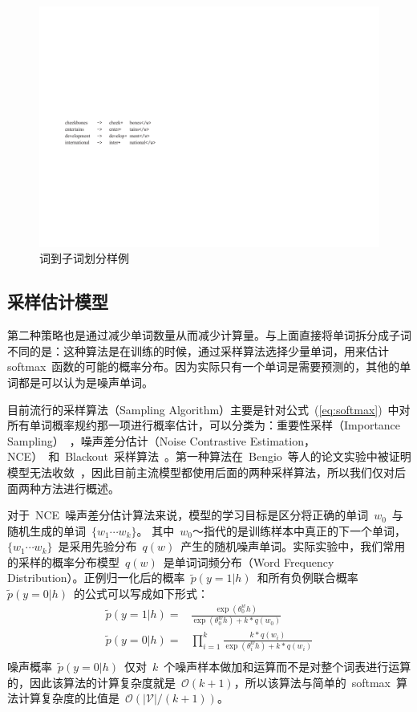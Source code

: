 \begin{figure}[!h]
  \centering
\includegraphics[width=0.56\linewidth]{./figures/subword.pdf}
\caption{词到子词划分样例}\label{fig:subword}
\end{figure}

\subsection{采样估计模型}
第二种策略也是通过减少单词数量从而减少计算量。与上面直接将单词拆分成子词不同的是：这种算法是在训练的时候，通过采样算法选择少量单词，用来估计softmax~函数的可能的概率分布。因为实际只有一个单词是需要预测的，其他的单词都是可以认为是噪声单词。

目前流行的采样算法（Sampling Algorithm）主要是针对公式~(\ref{eq:softmax})~中对所有单词概率规约那一项进行概率估计，可以分类为：重要性采样（Importance Sampling）~，噪声差分估计（Noise Contrastive Estimation，NCE）~和~Blackout~采样算法~。第一种算法在~Bengio~等人的论文实验中被证明模型无法收敛~，因此目前主流模型都使用后面的两种采样算法，所以我们仅对后面两种方法进行概述。

对于~NCE~噪声差分估计算法来说，模型的学习目标是区分将正确的单词~$w_0$~与随机生成的单词~$\{w_1\cdots w_k\}$。
其中~$w_0$～指代的是训练样本中真正的下一个单词，$\{w_1\cdots w_k\}$~是采用先验分布~$q(w)$~产生的随机噪声单词。实际实验中，我们常用的采样的概率分布模型~$q(w)$~是单词词频分布（Word Frequency Distribution）。正例归一化后的概率~$\tilde{p}(y=1|h)$~和所有负例联合概率~$\tilde{p}(y=0|h)$~的公式可以写成如下形式：
\begin{equation}\label{equ:nce}
\begin{split}
  \tilde{p}(y=1|h)=&\frac{\exp( \theta^w_0 h)}{ \exp( \theta^w_0 h)+k *q(w_0)}\\
  \tilde{p}(y=0|h)=&\prod_{i=1}^{k}\frac{k *q(w_i)}{\exp( \theta^w_i h)+k *q(w_i)}\\
\end{split}
\end{equation}
噪声概率~$\tilde{p}(y=0|h)$~仅对~$k$~个噪声样本做加和运算而不是对整个词表进行运算的，因此该算法的计算复杂度就是~$\mathcal{O}(k+1)$，所以该算法与简单的~softmax~算法计算复杂度的比值是~$\mathcal{O}(\mathcal{|V|}/(k+1))$。

